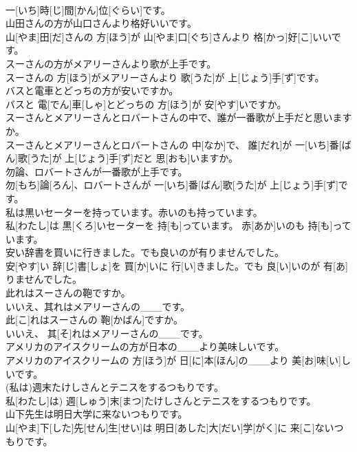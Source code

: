 \documentclass[8pt]{extreport}
\begin{document}
\begin{CJK}{UTF8}{min}
\\	一[いち]時[じ]間[かん]位[ぐらい]です。
\\	山田さんの方が山口さんより格好いいです。	
\\	山[やま]田[だ]さんの 方[ほう]が 山[やま]口[ぐち]さんより 格[かっ]好[こ]いいです。
\\	スーさんの方がメアリーさんより歌が上手です。	
\\	スーさんの 方[ほう]がメアリーさんより 歌[うた]が 上[じょう]手[ず]です。
\\	バスと電車とどっちの方が安いですか。	
\\	バスと 電[でん]車[しゃ]とどっちの 方[ほう]が 安[やす]いですか。
\\	スーさんとメアリーさんとロバートさんの中で、誰が一番歌が上手だと思いますか。	
\\	スーさんとメアリーさんとロバートさんの 中[なか]で、 誰[だれ]が 一[いち]番[ばん]歌[うた]が 上[じょう]手[ず]だと 思[おも]いますか。
\\	勿論、ロバートさんが一番歌が上手です。	
\\	勿[もち]論[ろん]、ロバートさんが 一[いち]番[ばん]歌[うた]が 上[じょう]手[ず]です。
\\	私は黒いセーターを持っています。赤いのも持っています。	
\\	私[わたし]は 黒[くろ]いセーターを 持[も]っています。 赤[あか]いのも 持[も]っています。
\\	安い辞書を買いに行きました。でも良いのが有りませんでした。	
\\	安[やす]い 辞[じ]書[しょ]を 買[か]いに 行[い]きました。でも 良[い]いのが 有[あ]りませんでした。
\\	此れはスーさんの鞄ですか。 
\\	いいえ、其れはメアリーさんの___です。	
\\	此[こ]れはスーさんの 鞄[かばん]ですか。 
\\	いいえ、 其[そ]れはメアリーさんの___です。
\\	アメリカのアイスクリームの方が日本の___より美味しいです。	
\\	アメリカのアイスクリームの 方[ほう]が 日[に]本[ほん]の___より 美[お]味[い]しいです。
\\	(私は)週末たけしさんとテニスをするつもりです。	
\\	私[わたし]は) 週[しゅう]末[まつ]たけしさんとテニスをするつもりです。
\\	山下先生は明日大学に来ないつもりです。	
\\	山[やま]下[した]先[せん]生[せい]は 明日[あした]大[だい]学[がく]に 来[こ]ないつもりです。

\end{CJK}
\end{document}
